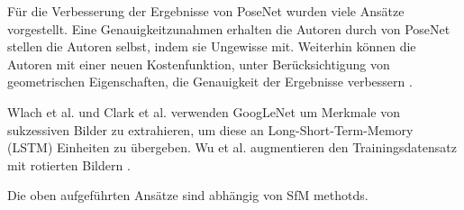 Für die Verbesserung der Ergebnisse von PoseNet wurden viele Ansätze vorgestellt. Eine Genauigkeitzunahmen erhalten die Autoren durch von PoseNet stellen die Autoren selbst, indem sie Ungewisse mit. Weiterhin können die Autoren mit einer neuen Kostenfunktion, unter Berücksichtigung von geometrischen Eigenschaften, die Genauigkeit der Ergebnisse verbessern \cite{kendallGeometricLossFunctions2017}.

Wlach et al. \cite{walchImagebasedLocalizationUsing2016} und Clark et al. \cite{clarkVidLocDeepSpatioTemporal2017} verwenden GoogLeNet um Merkmale von sukzessiven Bilder zu extrahieren, um diese an Long-Short-Term-Memory (LSTM) \cite{hochreiterLongShortTermMemory1997a} Einheiten zu übergeben.
Wu et al. augmentieren den Trainingsdatensatz mit rotierten Bildern \cite{wuDelvingDeeperConvolutional2017}.


Die oben aufgeführten Ansätze sind abhängig von SfM methotds.



% 

